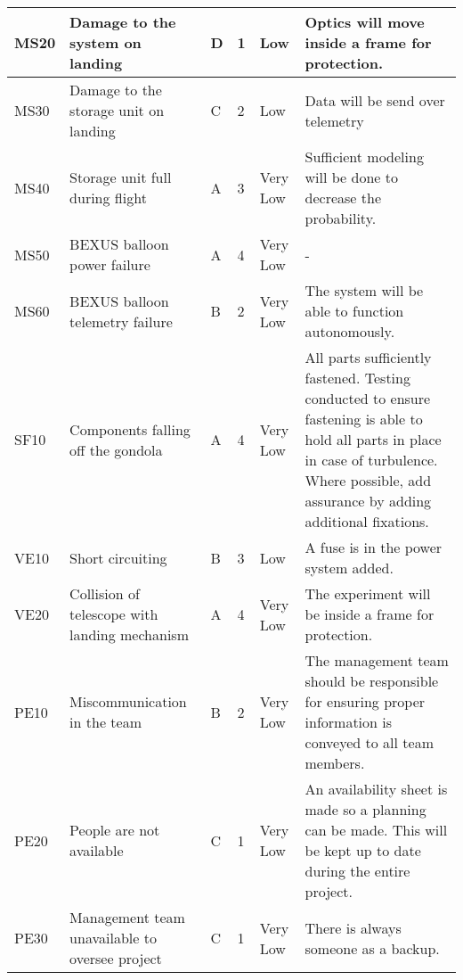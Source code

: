 \begin{longtable}{|m{}| m{} |m{} |m{}|m{}| m{}|}
MS20 & Damage to the system on landing										& D & 1 & \cellcolor[HTML]{FCFF2F}Low			& Optics will move inside a frame for protection.\\\hline

MS30 & Damage to the storage unit on landing									& C & 2 & \cellcolor[HTML]{FCFF2F}Low			& Data will be send over telemetry\\\hline

MS40 & Storage unit full during flight											& A & 3 & \cellcolor[HTML]{34FF34}Very Low	& Sufficient modeling will be done to decrease the probability.\\\hline

MS50 & BEXUS balloon power failure											& A & 4 & \cellcolor[HTML]{34FF34}Very Low	& -\\\hline

MS60 & BEXUS balloon telemetry failure										& B & 2 & \cellcolor[HTML]{34FF34}Very Low	& The system will be able to function autonomously.\\\hline


SF10 & Components falling off the gondola									& A & 4 & \cellcolor[HTML]{34FF34}Very Low	& All parts sufficiently fastened. Testing conducted to ensure fastening is able to hold all parts in place in case of turbulence. Where possible, add assurance by adding additional fixations.\\\hline


VE10 & Short circuiting														& B & 3 & \cellcolor[HTML]{FCFF2F}Low			& A fuse is in the power system added.\\\hline

VE20 & Collision of telescope with landing mechanism						& A & 4 & \cellcolor[HTML]{34FF34}Very Low	& The experiment will be inside a frame for protection.\\\hline


PE10 & Miscommunication in the team											& B & 2 & \cellcolor[HTML]{34FF34}Very Low	& The management team should be responsible for ensuring proper information is conveyed to all team members.\\\hline

PE20 & People are not available												& C & 1 & \cellcolor[HTML]{34FF34}Very Low	& An availability sheet is made so a planning can be made. This will be kept up to date during the entire project.\\\hline

PE30 & Management team unavailable to oversee project						& C & 1 & \cellcolor[HTML]{34FF34}Very Low	& There is always someone as a backup.\\\hline


\end{longtable}
